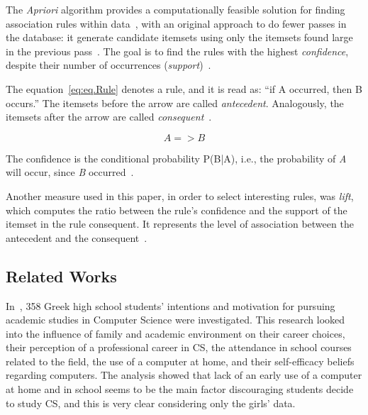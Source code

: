 The \emph{Apriori} algorithm provides a computationally feasible solution for finding association rules within data~\cite{Hastie2009}, with an original approach to do fewer passes in the database: it generate candidate itemsets using only the itemsets found large in the previous pass~\cite{Agrawal1994}. The goal is to find the rules with the highest \emph{confidence}, despite their number of occurrences (\emph{support})~\cite{taniar_exception_2008}.

The equation~\ref{eq:eq.Rule} denotes a rule, and it is read as: ``if A occurred, then B occurs.'' The itemsets before the arrow are called \emph{antecedent}. Analogously, the itemsets after the arrow are called \emph{consequent}~\cite{Hastie2009}.

\begin{equation}
{A} => {B}
\label{eq:eq.Rule}%
\end{equation}

The confidence is the conditional probability P(B|A), i.e., the probability of \emph{A} will occur, since \emph{B} occurred~\cite{Hastie2009}.

Another measure used in this paper, in order to select interesting rules, was \emph{lift}, which computes the ratio between the rule's confidence and the support of the itemset in the rule consequent. It represents the level of association between the antecedent and the consequent~\cite{tan2006introduction}.


%

\subsection{Related Works}\label{sec:background:related}%

In~\cite{papastergiou_are_2008}, 358 Greek high school students' intentions and motivation for pursuing academic studies in Computer Science were investigated. This research looked into the influence of family and academic environment on their career choices, their perception of a professional career in CS, the attendance in school courses related to the field, the use of a computer at home, and their self-efficacy beliefs regarding computers. The analysis showed that lack of an early use of a computer at home and in school seems to be the main factor discouraging students decide to study CS, and this is very clear considering only the girls' data.


